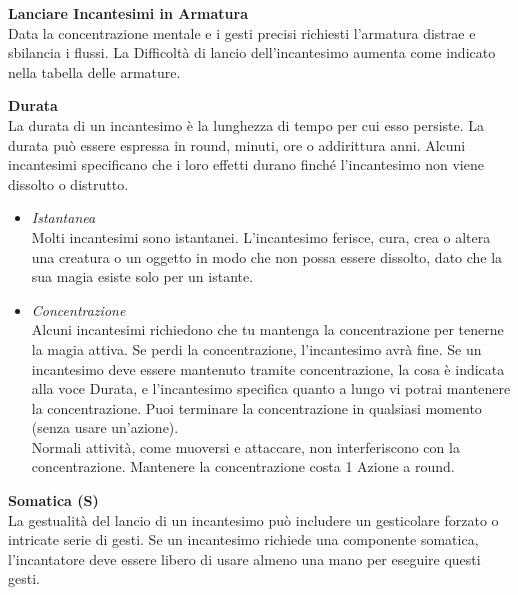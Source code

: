 \begin{multicols}{2}
\medskip

\textbf{Lanciare Incantesimi in Armatura}\\
Data la concentrazione mentale e i gesti precisi richiesti l'armatura distrae e sbilancia i flussi. La Difficoltà di lancio dell'incantesimo aumenta come indicato nella tabella delle armature.\\

\medskip

\textbf{Durata}\\
La durata di un incantesimo è la lunghezza di tempo per cui esso persiste. La durata può essere espressa in round, minuti, ore o addirittura anni. Alcuni incantesimi specificano che i loro effetti durano finché l'incantesimo non viene dissolto o distrutto.\\
\begin{itemize}
\item
\textit{Istantanea}\\
Molti incantesimi sono istantanei. L'incantesimo ferisce, cura, crea o altera una creatura o un oggetto in modo che non possa essere dissolto, dato che la sua magia esiste solo per un istante.\\
\item
\textit{Concentrazione}\\
Alcuni incantesimi richiedono che tu mantenga la concentrazione per tenerne la magia attiva. Se perdi la concentrazione, l'incantesimo avrà fine. Se un incantesimo deve essere mantenuto tramite concentrazione, la cosa è indicata alla voce Durata, e l'incantesimo specifica quanto a lungo vi potrai mantenere la concentrazione. Puoi terminare la concentrazione in qualsiasi momento (senza usare un'azione).\\
Normali attività, come muoversi e attaccare, non interferiscono con la concentrazione.
Mantenere la concentrazione costa 1 Azione a round.
\end{itemize}

\medskip

\textbf{Somatica (S)}\\
La gestualità del lancio di un incantesimo può includere un gesticolare forzato o intricate serie di gesti. Se un incantesimo richiede una componente somatica, l'incantatore deve essere libero di usare almeno una mano per eseguire questi gesti.\\

\medskip


\end{multicols}
